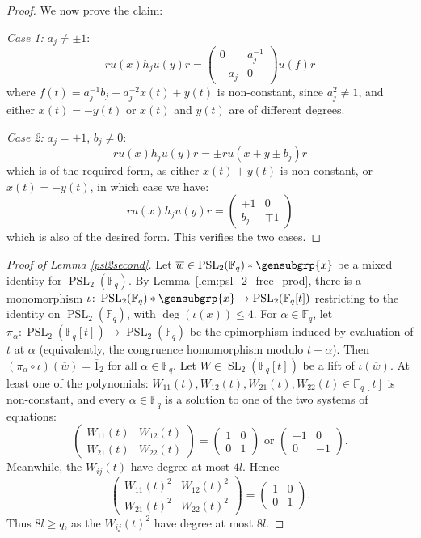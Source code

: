 \documentclass[a4paper,11pt]{amsproc}
\newcommand{\finfield}{\mathbb{F}}%
\DeclareMathOperator{\SL}{SL}%
\DeclareMathOperator{\PSL}{PSL}%
\theoremstyle{plain}
\theoremstyle{definition}
\begin{document}
\begin{proof}
		We now prove the claim:
		
		\emph{Case 1:} $a_j\neq\pm 1$: 
		$$
		r u(x) h_j u(y) r = 
		\begin{pmatrix}
			0 & a_j^{-1} \\ -a_j & 0
		\end{pmatrix} 
		u(f) r
		$$
		where $f(t)=a_j^{-1}b_j+a_j^{-2}x(t)+y(t)$ is non-constant, since $a_j^2\neq 1$, and either $x(t)=-y(t)$ or $x(t)$ and $y(t)$ are of different degrees. 
		
		\emph{Case 2:} $a_j=\pm 1$, $b_j\neq 0$: 
		$$
		r u(x) h_j u(y) r=\pm r u (x+y\pm b_j) r
		$$
		which is of the required form, as either $x(t)+y(t)$ is non-constant, or $x(t)=-y(t)$, in which case we have: 
		$$
		r u(x) h_j u(y) r 
		=\begin{pmatrix}
			\mp 1 & 0 \\ b_j & \mp 1
		\end{pmatrix}
		$$
		which is also of the desired form. This verifies the two cases.
	\end{proof}
	
	\begin{proof}[Proof of Lemma \ref{psl2second}]
		Let $\overline{w}\in\PSL_2(\finfield_q)\ast\gensubgrp{x}$ be a mixed identity for $\PSL_2(\finfield_q)$. By Lemma~\ref{lem:psl_2_free_prod}, there is a monomorphism $\iota\colon\PSL_2(\finfield_q)\ast\gensubgrp{x}\to\PSL_2(\finfield_q[t])$ restricting to the identity on $\PSL_2(\finfield_q)$, with $\deg(\iota(x))\leq 4$. For $\alpha\in\finfield_q$, let $\pi_{\alpha}\colon\PSL_2(\finfield_q[t])\to\PSL_2(\finfield_q)$ be the epimorphism induced by evaluation of $t$ at $\alpha$ (equivalently, the congruence homomorphism modulo $t-\alpha$). Then $(\pi_{\alpha}\circ\iota)(\overline{w})=\overline{1}_2$ for all $\alpha\in\finfield_q$. Let $W\in\SL_2(\finfield_q[t])$ be a lift of $\iota(\overline{w})$. At least one of the polynomials: $W_{11}(t),W_{12}(t),W_{21}(t),W_{22}(t)\in\finfield_q[t]$ is non-constant, and every $\alpha\in\finfield_q$ is a solution to one of the two systems of equations: 
		$$
		\begin{pmatrix}
			W_{11}(t) & W_{12}(t) \\ 
			W_{21}(t) & W_{22}(t)
		\end{pmatrix} 
		= \begin{pmatrix}
			1 & 0 \\ 0 & 1
		\end{pmatrix}  \text{ or }
		\begin{pmatrix}
			-1 & 0 \\ 0 & -1
		\end{pmatrix}\text{.}
		$$
		Meanwhile, the $W_{ij}(t)$ have degree at most $4l$. Hence 
		$$
		\begin{pmatrix}
			W_{11}(t)^2 & W_{12}(t)^2 \\ 
			W_{21}(t)^2 & W_{22}(t)^2
		\end{pmatrix} 
		= \begin{pmatrix}
			1 & 0 \\ 0 & 1
		\end{pmatrix}.
		$$
		Thus $8l \geq q$, as the $W_{ij}(t)^2$ have degree at most $8l$. 
	\end{proof}
	
\end{document}
